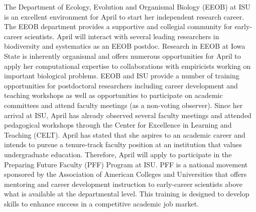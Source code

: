 \documentclass[11pt]{article}
\begin{document}
The Department of Ecology, Evolution and Organismal Biology (EEOB) at ISU is an excellent environment for April to start her independent research career. 
The EEOB department provides a supportive and collegial community for early-career scientists.
April will interact with several leading researchers in biodiversity and systematics as an EEOB postdoc. %
Research in EEOB at Iowa State is inherently organismal and offers numerous opportunities for April to apply her computational expertise to collaborations with empiricists working on important biological problems.
EEOB and ISU provide a number of training opportunities for postdoctoral researchers including career development and teaching workshops as well as opportunities to participate on academic committees and attend faculty meetings (as a non-voting observer). 
Since her arrival at ISU, April has already observed several faculty meetings and attended pedagogical workshops through the Center for Excellence in Learning and Teaching (CELT).
April has stated that she aspires to an academic career and intends to pursue a tenure-track faculty position at an institution that values undergraduate education.
Therefore, April will apply to participate in the Preparing Future Faculty (PFF) Program at ISU. PFF is a national movement sponsored by the Association of American Colleges and Universities that offers mentoring and career development instruction to early-career scientists above what is available at the departmental level. This training is designed to develop skills to enhance success in a competitive academic job market.
\end{document}
